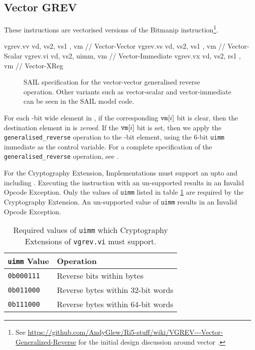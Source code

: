 \clearpage
\subsection{Vector GREV}

These instructions are vectorised versions of the Bitmanip
 instruction\footnote{
See \url{https://github.com/AndyGlew/Ri5-stuff/wiki/VGREV---Vector-Generalized-Reverse}
for the initial design discussion around vector .
}.

\begin{cryptoisa}
vgrev.vv     vd, vs2, vs1 , vm  // Vector-Vector
vgrev.vs     vd, vs2, vs1 , vm  // Vector-Scalar
vgrev.vi     vd, vs2, uimm, vm  // Vector-Immediate
vgrev.vx     vd, vs2, rs1 , vm  // Vector-XReg
\end{cryptoisa}

\begin{figure}[h]

\caption{
SAIL specification for the vector-vector generalised reverse operation.
Other variants such as vector-scalar and vector-immediate can be seen in
the SAIL model code.
}
\label{fig:sail:vgrev}
\end{figure}

For each \EEW-bit wide element in , if the corresponding ${\tt vm}[i]$
bit is clear, then the destination element in \vrd is {\em zeroed}.
If the ${\tt vm}[i]$ bit is set, then we apply the
\texttt{generalised\_reverse} operation to the \EEW-bit element, using the
$6$-bit \texttt{uimm} immediate as the control variable.
For a complete specification of the \texttt{generalised\_reverse}
operation, see 
\cite[Section 2.2.2, Generalized Reverse]{riscv:bitmanip:draft}.

For the Cryptography Extension,
Implementations must support an \EEW upto and including \XLEN.
Executing the instruction with an un-supported \EEW results in an
Invalid Opcode Exception.
Only the values of \texttt{uimm} listed in table \ref{tab:vgrev:uimm}
are required by the Cryptography Extension.
An un-supported value of \texttt{uimm} results in an
Invalid Opcode Exception.

\begin{table}
\centering
\begin{tabular}{ll}
\texttt{uimm} Value & Operation                         \\
\hline
\texttt{0b000111}   & Reverse bits within bytes         \\
\texttt{0b011000}   & Reverse bytes within 32-bit words \\
\texttt{0b111000}   & Reverse bytes within 64-bit words \\
\hline
\end{tabular}
\caption{Required values of \texttt{uimm} which Cryptography Extensions
of \texttt{vgrev.vi} must support.}
\label{tab:vgrev:uimm}
\end{table}
